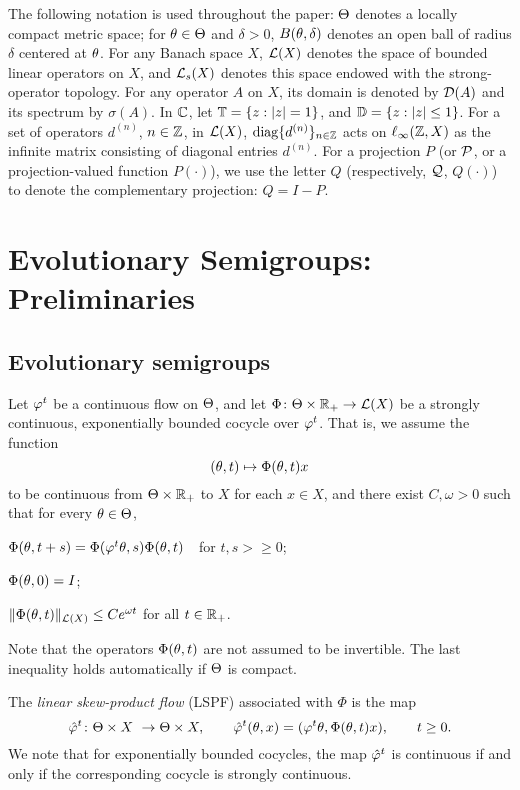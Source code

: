 The following notation is used throughout the paper:
$\Theta$ denotes a locally compact metric space; for $\theta\in\Theta$ and
$\delta>0$, $B(\theta,\delta)$ denotes an open ball of radius $\delta$
centered at $\theta$.  For any Banach space $X$,
${\cal{L}}(X)$ denotes the space of bounded linear operators on $X$, and
${\cal{L}}_s(X)$ denotes this space endowed with the strong-operator
topology.  For any operator $A$ on $X$, its domain is denoted by
${\cal{D}}(A)$ and its spectrum  by $\sigma(A)$.  In  ${\Bbb{C}}$, let ${\Bbb{T}}=\{z
:|z|=1\}$, and ${\Bbb{D}}=\{z: |z|\le 1\}$. For a set of operators
$d^{(n)}$, $n\in{\Bbb{Z}}$, in ${\cal{L}}(X)$,  $\operatorname{diag}\{d^{(n)}\}_{n\in{\Bbb{Z}}}$
acts on $\ell_\infty({\Bbb{Z}},X)$ as the infinite matrix consisting of diagonal entries
$d^{(n)}$. For a projection $P$ (or ${\cal{P}}$, or a projection-valued
function $P(\cdot)$), we use the letter $Q$ (respectively, ${\cal{Q}}$,
$Q(\cdot)$) to denote the complementary projection: $Q=I-P$.





\section{Evolutionary Semigroups: Preliminaries}
\setcounter{equation}{0}

\subsection{Evolutionary semigroups}

Let $\varphi^t$ be a continuous flow on $\Theta$, and
let $\Phi\colon \Theta\times{\Bbb{R}}_{+}\to {\cal{L}}(X)$ be a
strongly continuous, exponentially bounded
cocycle over $\varphi^t$.  That is, we assume the function
$$(\theta,t) \mapsto \Phi(\theta,t)x$$
to be continuous from $\Theta\times{\Bbb{R}}_{+}$ to $X$
for each $x\in X$, and there exist $C,\omega>0$ such that
for every $\theta\in \Theta$,
\begin{list}{)}{}
\item $\Phi(\theta,t+s)=\Phi(\varphi^t\theta,s)\Phi(\theta,t)\quad$for $t,s>\ge0$;
\item $\Phi(\theta,0)=I$;
\item  $\|\Phi(\theta,t)\|_{{\cal{L}}(X)}\le C
e^{\omega t}$ for all $t\in{\Bbb{R}}_+$.
\end{list}
Note that the operators $\Phi(\theta,t)$ are not assumed to be invertible.
The last inequality holds automatically if $\Theta$ is compact.

The {\em linear skew-product flow} (LSPF) associated with $\Phi$ is
the map
\begin{equation}\lb{LSPF}
\hp^t\colon \TH\times X\ \to \TH\times X,\qquad
\hp^t(\th,x)=(\vphi^t\th,\Phi(\th,t)x),\qquad t\ge 0.
\end{equation}
We note that for exponentially bounded cocycles, the map ${\hat{\varphi}}^t$ is
continuous if and only if the corresponding cocycle is strongly
continuous.

